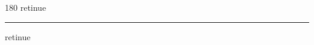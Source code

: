 
\begin{frame}
\begin{center}
\begin{turn}{180}
{\fontsize{2.5cm}{1em}\selectfont retinue}
\end{turn}
\vspace{1em}\par  
\hrule
\vspace{1em}\par  
{\fontsize{2.5cm}{1em}\selectfont retinue}
\end{center}
\end{frame}
